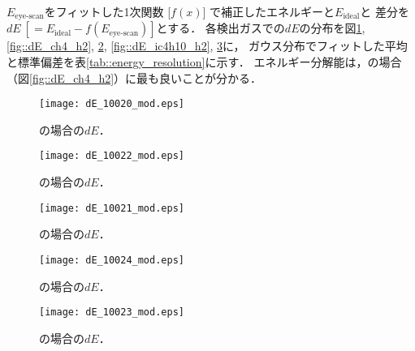 \documentclass[../master]{subfiles}
\begin{document}
$E_{\text{eye-scan}}$をフィットした1次関数 [$f(x)$] で補正したエネルギーと$E_{\text{ideal}}$と
差分を$dE\ [=E_{\text{ideal}}-f(E_{\text{eye-scan}})]$とする．
各検出ガスでの$dE$の分布を図\ref{fig::dE_ch4}, \ref{fig::dE_ch4_h2}, \ref{fig::dE_ch4_he},
\ref{fig::dE_ic4h10_h2}, \ref{fig::dE_ic4h10_he}に，
ガウス分布でフィットした平均と標準偏差を表\ref{tab::energy_resolution}に示す．
エネルギー分解能は，\MethaneHydro の場合（図\ref{fig::dE_ch4_h2}）に最も良いことが分かる．
\begin{figure}
  \centering
  \begin{minipage}{0.45\columnwidth}
    \centering
    \texttt{[image: dE\_10020\_mod.eps]}
    \caption{\Methane の場合の$dE$．}
    \label{fig::dE_ch4}
  \end{minipage}
\end{figure}
\begin{figure}
  \begin{minipage}{0.45\columnwidth}
    \centering
    \texttt{[image: dE\_10022\_mod.eps]}
    \caption{\MethaneHydro の場合の$dE$．}
    \label{fig::dE_ch4_h2}
  \end{minipage}
  \centering
  \begin{minipage}{0.45\columnwidth}
    \centering
    \texttt{[image: dE\_10021\_mod.eps]}
    \caption{\MethaneHerium の場合の$dE$．}
    \label{fig::dE_ch4_he}
  \end{minipage}
\end{figure}
\begin{figure}
  \begin{minipage}{0.45\columnwidth}
    \centering
    \texttt{[image: dE\_10024\_mod.eps]}
    \caption{\isoButaneHydro の場合の$dE$．}
    \label{fig::dE_ic4h10_h2}
  \end{minipage}
  \centering
  \begin{minipage}{0.45\columnwidth}
    \centering
    \texttt{[image: dE\_10023\_mod.eps]}
    \caption{\isoButaneHerium の場合の$dE$．}
    \label{fig::dE_ic4h10_he}
  \end{minipage}
\end{figure}
\end{document}

